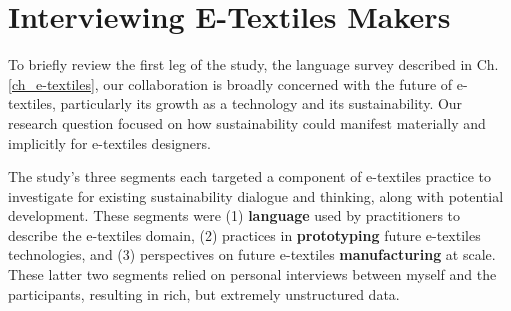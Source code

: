 




\section{Interviewing E-Textiles Makers}

To briefly review the first leg of the study, the language survey described in Ch. \ref{ch_e-textiles}, our collaboration is broadly concerned with the future of e-textiles, particularly its growth as a technology and its sustainability. Our research question focused on how sustainability could manifest materially and implicitly for e-textiles designers. 


The study's three segments each targeted a component of e-textiles practice to investigate for existing sustainability dialogue and thinking, along with potential development. These segments were (1) \textbf{language} used by practitioners to describe the e-textiles domain, (2) practices in \textbf{prototyping} future e-textiles technologies, and (3) perspectives on future e-textiles \textbf{manufacturing} at scale. These latter two segments relied on personal interviews between myself and the participants, resulting in rich, but extremely unstructured data.

